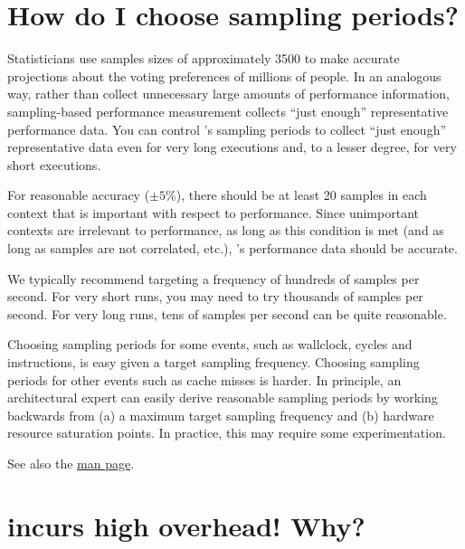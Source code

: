 \documentclass[11pt,letterpaper]{report}
\begin{document}

\section{How do I choose \hpcrun{} sampling periods?}
\label{sec:troubleshooting:hpcrun-sample-periods}

Statisticians use samples sizes of approximately 3500 to make accurate projections about the voting preferences of millions of people.
In an analogous way, rather than collect unnecessary large amounts of performance information, sampling-based performance measurement collects ``just enough'' representative performance data.
You can control \hpcrun{}'s sampling periods to collect ``just enough'' representative data even for very long executions and, to a lesser degree, for very short executions.

For reasonable accuracy ($\pm 5\%$), there should be at least 20 samples in each context that is important with respect to performance.
Since unimportant contexts are irrelevant to performance, as long as this condition is met (and as long as samples are not correlated, etc.), \HPCToolkit{}'s performance data should be accurate.

We typically recommend targeting a frequency of hundreds of samples per second.
For very short runs, you may need to try thousands of samples per second.
For very long runs, tens of samples per second can be quite reasonable.

Choosing sampling periods for some events, such as wallclock, cycles and instructions, is easy given a target sampling frequency.
Choosing sampling periods for other events such as cache misses is harder.
In principle, an architectural expert can easily derive reasonable sampling periods by working backwards from (a) a maximum target sampling frequency and (b) hardware resource saturation points.
In practice, this may require some experimentation.

See also the \hpcrun{} \href{http://hpctoolkit.org/man/hpcrun.html}{man page}.



\section{\hpcrun{} incurs high overhead! Why?}
\end{document}
